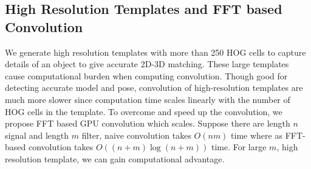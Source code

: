 \documentclass[10pt,twocolumn,letterpaper]{article}
\begin{document}

\subsection{High Resolution Templates and FFT based Convolution}
\label{sec:fft} 
We generate high resolution templates with more than 250 HOG cells to capture details of an object to give accurate 2D-3D matching. These large templates cause computational burden when computing convolution. Though good for detecting accurate model and pose, convolution of high-resolution templates are much more slower since computation time scales linearly with the number of HOG cells in the template. To overcome and speed up the convolution, we propose FFT based GPU convolution which scales. Suppose there are length $n$ signal and length $m$ filter, naive convolution takes $O(nm)$ time where as FFT-based convolution takes $O\left( (n + m)\log (n+m) \right)$ time. For large $m$, high resolution template, we can gain computational advantage.
\end{document}

